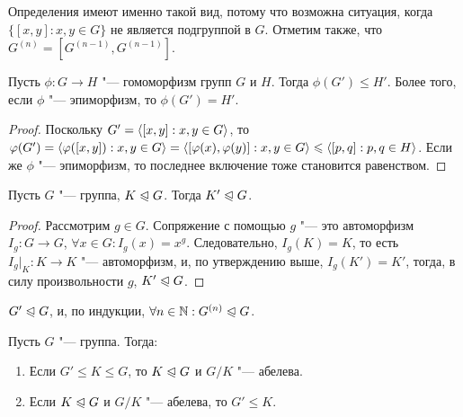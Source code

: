 \begin{note}
	Определения имеют именно такой вид, потому что возможна ситуация, когда $\{[x, y]: x, y \in G\}$ не является подгруппой в $G$. Отметим также, что $G^{(n)} = [G^{(n - 1)}, G^{(n - 1)}]$.
\end{note}

\begin{proposition}
	Пусть $\phi: G \to H$ "--- гомоморфизм групп $G$ и $H$. Тогда $\phi(G') \le H'$. Более того, если $\phi$ "--- эпиморфизм, то $\phi(G') = H'$.
\end{proposition}

\begin{proof}
	Поскольку $G' = \langle[x, y]: x, y \in G\rangle$, то $\varphi(G') = \langle\varphi([x, y]): x, y \in G\rangle = \langle[\varphi(x), \varphi(y)]: x, y \in G\rangle \leqslant \langle[p, q]: p, q \in H\rangle$. Если же $\phi$ "--- эпиморфизм, то последнее включение тоже становится равенством.
\end{proof}

\begin{corollary}
	Пусть $G$ "--- группа, $K \trianglelefteqslant G$. Тогда $K' \trianglelefteqslant G$.
\end{corollary}

\begin{proof}
	Рассмотрим $g \in G$. Сопряжение с помощью $g$ "--- это автоморфизм $I_g: G \to G$, $\forall x \in G: I_g(x) = x^g$. Следовательно, $I_g(K) = K$, то есть $I_g|_K : K \to K$ "--- автоморфизм, и, по утверждению выше, $I_g(K') = K'$, тогда, в силу произвольности $g$, $K' \trianglelefteqslant G$.
\end{proof}

\begin{corollary}
	$G' \trianglelefteqslant G$, и, по индукции, $\forall n \in \mathbb{N}: G^{(n)} \trianglelefteqslant G$.
\end{corollary}

\begin{theorem} Пусть $G$ "--- группа. Тогда:
	\begin{enumerate}
		\item Если $G' \le K \le G$, то $K \trianglelefteqslant G$ и $G / K$ "--- абелева.
		\item Если $K \trianglelefteqslant G$ и $G / K$ "--- абелева, то $G' \le K$.
	\end{enumerate}
\end{theorem}


